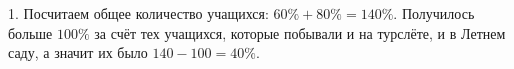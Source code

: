 1. Посчитаем общее количество учащихся: $60\%+80\%=140\%.$ Получилось больше $100\%$ за счёт тех учащихся, которые побывали и на турслёте, и в Летнем саду, а значит их было $140-100=40\%.$\\
